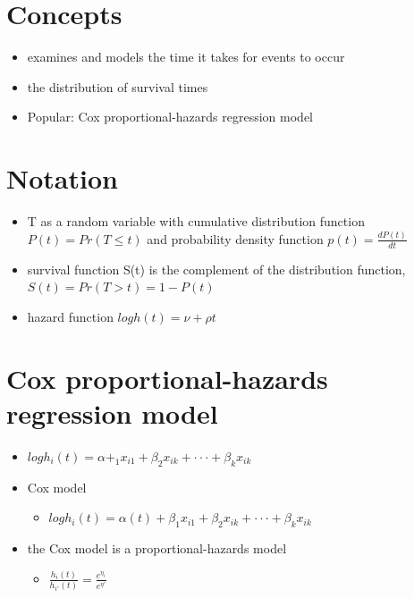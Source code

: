 \documentclass[
]{book}
\providecommand{\tightlist}{%
  \setlength{\itemsep}{0pt}\setlength{\parskip}{0pt}}
\begin{document}
\hypertarget{concepts}{%
\section{Concepts}\label{concepts}}

\begin{itemize}
\tightlist
\item
  examines and models the time it takes for events to occur
\item
  the distribution of survival times
\item
  Popular: Cox proportional-hazards regression model
\end{itemize}

\hypertarget{notation}{%
\section{Notation}\label{notation}}

\begin{itemize}
\tightlist
\item
  T as a random variable with cumulative distribution function \(P (t) = Pr(T ≤ t)\) and probability density function \(p(t) = \frac{dP (t)}{dt}\)
\item
  survival function S(t) is the complement of the distribution function, \(S(t) = Pr(T > t) = 1 − P (t)\)
\item
  hazard function \(log h(t) = ν + ρt\)
\end{itemize}

\hypertarget{cox-proportional-hazards-regression-model}{%
\section{Cox proportional-hazards regression model}\label{cox-proportional-hazards-regression-model}}

\begin{itemize}
\tightlist
\item
  \(log h_i(t)=α+_1x_{i1} +β_2x_{ik} +···+β_kx_{ik}\)
\item
  Cox model

  \begin{itemize}
  \tightlist
  \item
    \(log h_i(t)=α(t)+β_1x_{i1} +β_2x_{ik} +···+β_kx_{ik}\)
  \end{itemize}
\item
  the Cox model is a proportional-hazards model

  \begin{itemize}
  \tightlist
  \item
    \(\frac{h_i(t)}{h_{i'}(t)} = \frac{e^{\eta_i}}{e^{\eta'}}\)
  \end{itemize}
\end{itemize}
\end{document}
